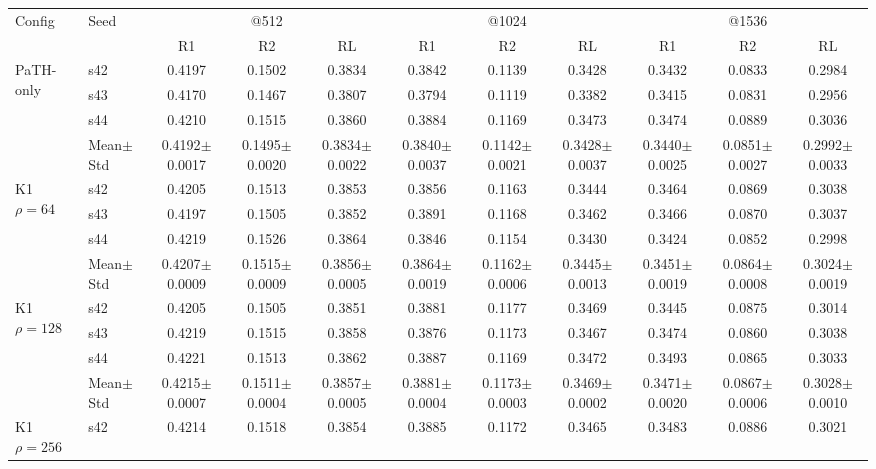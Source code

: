 \begin{table}[t]
\centering
\small
\begin{tabular}{llccccccccc}
\toprule
Config & Seed & \multicolumn{3}{c}{@512} & \multicolumn{3}{c}{@1024} & \multicolumn{3}{c}{@1536} \\
\cmidrule(lr){3-5} \cmidrule(lr){6-8} \cmidrule(lr){9-11}
 & & R1 & R2 & RL & R1 & R2 & RL & R1 & R2 & RL \\
\midrule
\multirow{4}{*}{PaTH-only} & s42 & 0.4197 & 0.1502 & 0.3834 & 0.3842 & 0.1139 & 0.3428 & 0.3432 & 0.0833 & 0.2984 \\
 & s43 & 0.4170 & 0.1467 & 0.3807 & 0.3794 & 0.1119 & 0.3382 & 0.3415 & 0.0831 & 0.2956 \\
 & s44 & 0.4210 & 0.1515 & 0.3860 & 0.3884 & 0.1169 & 0.3473 & 0.3474 & 0.0889 & 0.3036 \\
 & Mean$\pm$Std & 0.4192$\pm$0.0017 & 0.1495$\pm$0.0020 & 0.3834$\pm$0.0022 & 0.3840$\pm$0.0037 & 0.1142$\pm$0.0021 & 0.3428$\pm$0.0037 & 0.3440$\pm$0.0025 & 0.0851$\pm$0.0027 & 0.2992$\pm$0.0033 \\
\midrule
\multirow{4}{*}{K1 $\rho{=}64$} & s42 & 0.4205 & 0.1513 & 0.3853 & 0.3856 & 0.1163 & 0.3444 & 0.3464 & 0.0869 & 0.3038 \\
 & s43 & 0.4197 & 0.1505 & 0.3852 & 0.3891 & 0.1168 & 0.3462 & 0.3466 & 0.0870 & 0.3037 \\
 & s44 & 0.4219 & 0.1526 & 0.3864 & 0.3846 & 0.1154 & 0.3430 & 0.3424 & 0.0852 & 0.2998 \\
 & Mean$\pm$Std & 0.4207$\pm$0.0009 & 0.1515$\pm$0.0009 & 0.3856$\pm$0.0005 & 0.3864$\pm$0.0019 & 0.1162$\pm$0.0006 & 0.3445$\pm$0.0013 & 0.3451$\pm$0.0019 & 0.0864$\pm$0.0008 & 0.3024$\pm$0.0019 \\
\midrule
\multirow{4}{*}{K1 $\rho{=}128$} & s42 & 0.4205 & 0.1505 & 0.3851 & 0.3881 & 0.1177 & 0.3469 & 0.3445 & 0.0875 & 0.3014 \\
 & s43 & 0.4219 & 0.1515 & 0.3858 & 0.3876 & 0.1173 & 0.3467 & 0.3474 & 0.0860 & 0.3038 \\
 & s44 & 0.4221 & 0.1513 & 0.3862 & 0.3887 & 0.1169 & 0.3472 & 0.3493 & 0.0865 & 0.3033 \\
 & Mean$\pm$Std & 0.4215$\pm$0.0007 & 0.1511$\pm$0.0004 & 0.3857$\pm$0.0005 & 0.3881$\pm$0.0004 & 0.1173$\pm$0.0003 & 0.3469$\pm$0.0002 & 0.3471$\pm$0.0020 & 0.0867$\pm$0.0006 & 0.3028$\pm$0.0010 \\
\midrule
\multirow{4}{*}{K1 $\rho{=}256$} & s42 & 0.4214 & 0.1518 & 0.3854 & 0.3885 & 0.1172 & 0.3465 & 0.3483 & 0.0886 & 0.3021 \\

\end{tabular}
\end{table}
